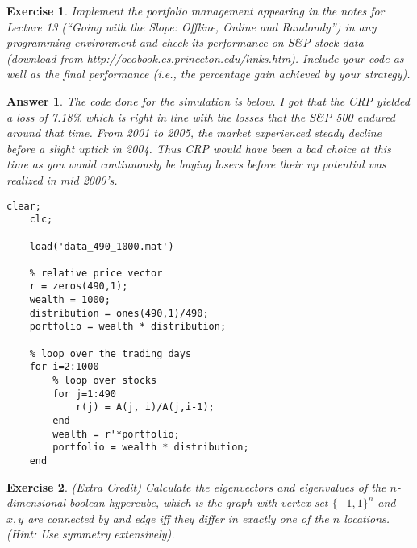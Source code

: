 \documentclass[12pt]{article}
\theoremstyle{colon}
\newtheorem{exercise}{Exercise}
\newtheorem*{answer}{Answer}
\begin{document}
\clearpage

\begin{exercise}
  Implement the portfolio management appearing in the notes for Lecture 13 (``Going with the Slope: Offline, Online and Randomly'') in any programming environment and check its performance on S\&P stock data (download from http://ocobook.cs.princeton.edu/links.htm). Include your code as well as the final performance (i.e., the percentage gain achieved by your strategy).
\end{exercise}

\begin{answer}
  The code done for the simulation is below. I got that the CRP yielded a loss of 7.18\% which is right in line with the losses that the S\&P 500 endured around that time. From 2001 to 2005, the market experienced steady decline before a slight uptick in 2004. Thus CRP would have been a bad choice at this time as you would continuously be buying losers before their up potential was realized in mid 2000's.

  \begin{lstlisting}[style=Matlab-editor, basicstyle=\scriptsize]
    clear;
    clc;

    load('data_490_1000.mat')

    % relative price vector
    r = zeros(490,1);
    wealth = 1000;
    distribution = ones(490,1)/490;
    portfolio = wealth * distribution;

    % loop over the trading days
    for i=2:1000
        % loop over stocks
        for j=1:490
            r(j) = A(j, i)/A(j,i-1);
        end
        wealth = r'*portfolio;
        portfolio = wealth * distribution;
    end
  \end{lstlisting}
\end{answer}

\clearpage

\begin{exercise}
  (Extra Credit) Calculate the eigenvectors and eigenvalues of the $n$-dimensional boolean hypercube, which is the graph with vertex set $\{-1,1\}^n$ and $x,y$ are connected by and edge iff they differ in exactly one of the $n$ locations. (Hint: Use symmetry extensively).
\end{exercise}
\end{document}
